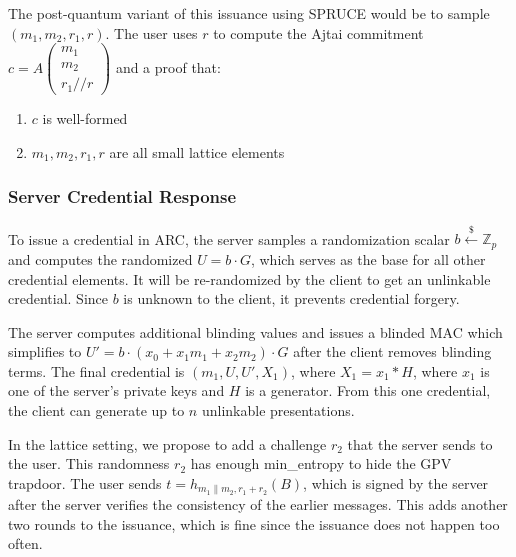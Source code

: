 The post-quantum variant of this issuance using SPRUCE would be to sample $(m_1, m_2, r_1, r)$. The user uses $r$ to compute the Ajtai commitment $c=A\left(\begin{array}{c}m_1\\m_2\\r_1//r\end{array}\right)$ and a proof that: 
\begin{enumerate}
    \item $c$ is well-formed
    \item $m_1, m_2, r_1, r$ are all small lattice elements
\end{enumerate}


\subsubsection{Server Credential Response}
To issue a credential in ARC, the server samples a randomization scalar $b \xleftarrow{\$} \mathbb{Z}_p$ and computes the randomized $U = b \cdot G$, which serves as the base for all other credential elements. It will be re-randomized by the client to get an unlinkable credential. Since $b$ is unknown to the client, it prevents credential forgery. 

The server computes additional blinding values and issues a blinded MAC which simplifies to $U' = b \cdot (x_0 + x_1 m_1 + x_2 m_2) \cdot G $ after the client removes blinding terms.
The final credential is $(m_1, U, U', X_1)$, where $X_1=x_1*H$, where $x_1$ is one of the server's private keys and $H$ is a generator. From this one credential, the client can generate up to $n$ unlinkable presentations.

In the lattice setting, we propose to add a challenge $r_2$ that the server sends to the user. This randomness $r_2$ has enough min\_entropy to hide the GPV trapdoor. The user sends $t=h_{m_1\parallel m_2,r_1+r_2}(B)$, which is signed by the server after the server verifies the consistency of the earlier messages. 
This adds another two rounds to the issuance, which is fine since the issuance does not happen too often. 

